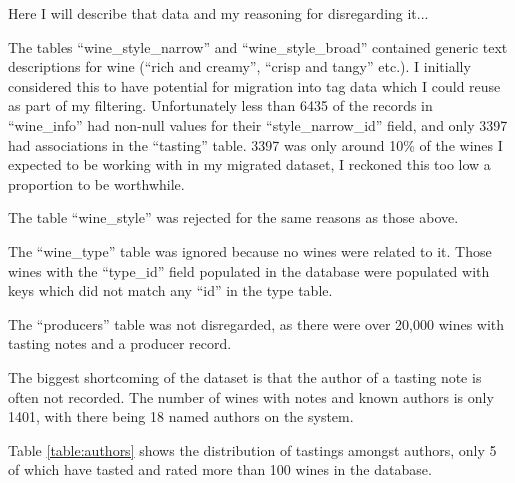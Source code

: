 Here I will describe that data and my reasoning for disregarding it...

The tables ``wine\_style\_narrow'' and ``wine\_style\_broad'' contained generic text descriptions for wine (``rich and creamy'', ``crisp and tangy'' etc.). I initially considered this to have potential for migration into tag data which I could reuse as part of my filtering. Unfortunately less than 6435 of the records in ``wine\_info'' had non-null values for their ``style\_narrow\_id'' field, and only 3397 had associations in the ``tasting'' table. 3397 was only around 10\% of the wines I expected to be working with in my migrated dataset, I reckoned this too low a proportion to be worthwhile.

The table ``wine\_style'' was rejected for the same reasons as those above.

The ``wine\_type'' table was ignored because no wines were related to it. Those wines with the ``type\_id'' field populated in the database were populated with keys which did not match any ``id'' in the type table.

The ``producers'' table was not disregarded, as there were over 20,000 wines with tasting notes and a producer record.


The biggest shortcoming of the dataset is that the author of a tasting note is often not recorded. The number of wines with notes and known authors is only 1401, with there being 18 named authors on the system. 

Table \ref{table:authors} shows the distribution of tastings amongst authors, only 5 of which have tasted and rated more than 100 wines in the database.

